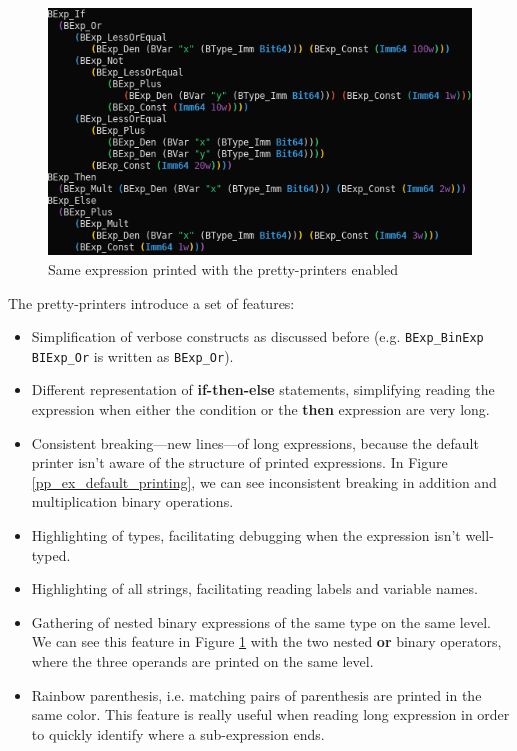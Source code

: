 \documentclass{kththesis}
\begin{document}
\begin{figure}[!h]
	\includegraphics[width=\textwidth]{figures/pp_ex_pretty_printing.png}
	\centering
	\caption{Same expression printed with the pretty-printers enabled}
	\label{pp_ex_pretty_printing}
\end{figure}

The pretty-printers introduce a set of features:

\begin{itemize}
    \item Simplification of verbose constructs as discussed before (e.g. \texttt{BExp\_BinExp BIExp\_Or} is written as \texttt{BExp\_Or}).
    \item Different representation of \textbf{if-then-else} statements, simplifying reading the expression when either the condition or the \textbf{then} expression are very long.
    \item Consistent breaking---new lines---of long expressions, because the default printer isn't aware of the structure of printed expressions. In Figure \ref{pp_ex_default_printing}, we can see inconsistent breaking in addition and multiplication binary operations.
    \item Highlighting of types, facilitating debugging when the expression isn't well-typed.
    \item Highlighting of all strings, facilitating reading labels and variable names.
    \item Gathering of nested binary expressions of the same type on the same level. We can see this feature in Figure \ref{pp_ex_pretty_printing} with the two nested \textbf{or} binary operators, where the three operands are printed on the same level.
    \item Rainbow parenthesis, i.e. matching pairs of parenthesis are printed in the same color. This feature is really useful when reading long expression in order to quickly identify where a sub-expression ends.
\end{itemize}
\end{document}
